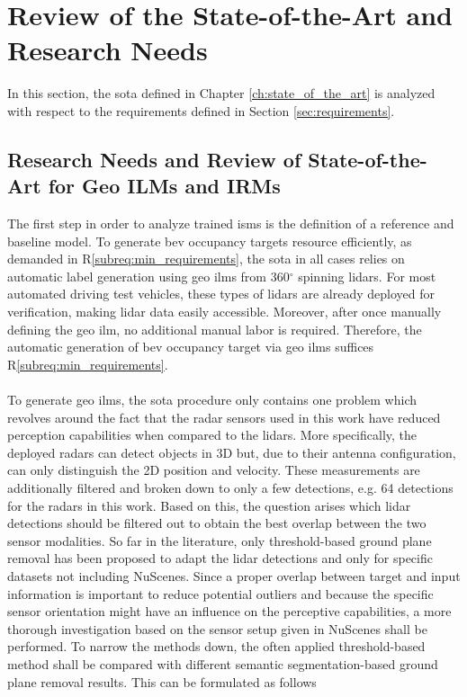\section{Review of the State-of-the-Art and Research Needs}
\label{sec:research_needs}
In this section, the \gls{sota} defined in Chapter \ref{ch:state_of_the_art} is analyzed with respect to the requirements defined in Section \ref{sec:requirements}.
%
\subsection{Research Needs and Review of State-of-the-Art for Geo ILMs and IRMs}
\label{subsec:research_needs_for_geo_ilms_n_irms}
The first step in order to analyze trained \gls{ism}s is the definition of a reference and baseline model. To generate \gls{bev} occupancy targets resource efficiently, as demanded in R\ref{subreq:min_requirements}, the \gls{sota} in all cases relies on automatic label generation using geo \gls{ilm}s from 360$^\circ$ spinning lidars. For most automated driving test vehicles, these types of lidars are already deployed for verification, making lidar data easily accessible. Moreover, after once manually defining the geo \gls{ilm}, no additional manual labor is required. Therefore, the automatic generation of \gls{bev} occupancy target via geo \gls{ilm}s suffices R\ref{subreq:min_requirements}.
\\\\
To generate geo \gls{ilm}s, the \gls{sota} procedure only contains one problem which revolves around the fact that the radar sensors used in this work have reduced perception capabilities when compared to the lidars. More specifically, the deployed radars can detect objects in 3D but, due to their antenna configuration, can only distinguish the 2D position and velocity. These measurements are additionally filtered and broken down to only a few detections, e.g. 64 detections for the radars in this work. Based on this, the question arises which lidar detections should be filtered out to obtain the best overlap between the two sensor modalities. So far in the literature, only threshold-based ground plane removal has been proposed to adapt the lidar detections and only for specific datasets not including NuScenes. Since a proper overlap between target and input information is important to reduce potential outliers and because the specific sensor orientation might have an influence on the perceptive capabilities, a more thorough investigation based on the sensor setup given in NuScenes shall be performed. To narrow the methods down, the often applied threshold-based method shall be compared with different semantic segmentation-based ground plane removal results. This can be formulated as follows

